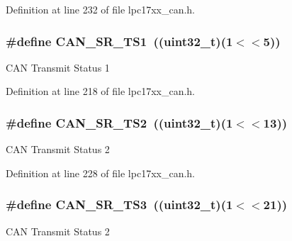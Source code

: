 \-Definition at line 232 of file lpc17xx\-\_\-can.\-h.

\hypertarget{group___c_a_n___private___macros_gaf2bffafb8e5b797b0187627a177737af}{
\subsubsection[{\-C\-A\-N\-\_\-\-S\-R\-\_\-\-T\-S1}]{\setlength{\rightskip}{0pt plus 5cm}\#define {\bf \-C\-A\-N\-\_\-\-S\-R\-\_\-\-T\-S1}~((uint32\-\_\-t)(1$<$$<$5))}}\label{group___c_a_n___private___macros_gaf2bffafb8e5b797b0187627a177737af}
\-C\-A\-N \-Transmit \-Status 1 

\-Definition at line 218 of file lpc17xx\-\_\-can.\-h.

\hypertarget{group___c_a_n___private___macros_ga562836002c7b3c6abb969e62d3173e13}{
\subsubsection[{\-C\-A\-N\-\_\-\-S\-R\-\_\-\-T\-S2}]{\setlength{\rightskip}{0pt plus 5cm}\#define {\bf \-C\-A\-N\-\_\-\-S\-R\-\_\-\-T\-S2}~((uint32\-\_\-t)(1$<$$<$13))}}\label{group___c_a_n___private___macros_ga562836002c7b3c6abb969e62d3173e13}
\-C\-A\-N \-Transmit \-Status 2 

\-Definition at line 228 of file lpc17xx\-\_\-can.\-h.

\hypertarget{group___c_a_n___private___macros_gaf9d57b9df21594aa65e48d705f64428e}{
\subsubsection[{\-C\-A\-N\-\_\-\-S\-R\-\_\-\-T\-S3}]{\setlength{\rightskip}{0pt plus 5cm}\#define {\bf \-C\-A\-N\-\_\-\-S\-R\-\_\-\-T\-S3}~((uint32\-\_\-t)(1$<$$<$21))}}\label{group___c_a_n___private___macros_gaf9d57b9df21594aa65e48d705f64428e}
\-C\-A\-N \-Transmit \-Status 2 

